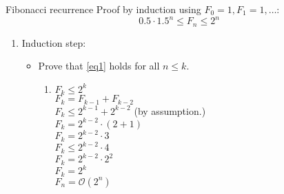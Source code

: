 \documentclass{beamer}
\begin{document}
\begin{frame}{Fibonacci recurrence}
Proof by induction using $F_0 = 1, F_1 = 1, \ldots$:
$$0.5 \cdot 1.5^n \leq F_n \leq 2^n$$
    \begin{enumerate}[3]
        \item Induction step:
        \begin{itemize}
            \item Prove that \eqref{eq1} holds for all $n \leq k$.
            \begin{enumerate}[1)]
             \item $ F_k \leq 2^k $ \\
                $ F_k = F_{k-1} + F_{k-2} $ \\
                $ F_k \leq 2^{k-1} + 2^{k-2} $ {\scriptsize (by assumption.)} \\
                $ F_k = 2^{k-2} \cdot (2 + 1) $ \\
                $ F_k = 2^{k-2} \cdot 3 $ \\
                $ F_k \leq 2^{k-2} \cdot 4 $ \\
                $ F_k = 2^{k-2} \cdot 2^2 $ \\
                $ F_k = 2^k $ \\
                \vspace{0.3cm}
                $ F_n = \mathcal{O}(2^n) $
            \end{enumerate}
        \end{itemize}
    \end{enumerate}
\end{frame}
\end{document}
